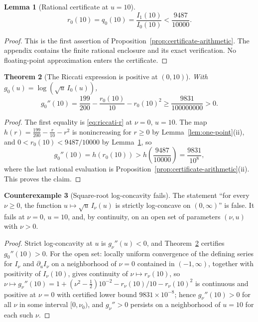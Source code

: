 \documentclass[preprint,12pt]{elsarticle}
\theoremstyle{plain}
\newtheorem{theorem}{Theorem}[section]
\newtheorem{lemma}[theorem]{Lemma}
\theoremstyle{definition}
\newtheorem{counterexample}[theorem]{Counterexample}
\theoremstyle{remark}
\begin{document}
\begin{lemma}[Rational certificate at \(u=10\)]\label{lem:certificate}
\begin{equation}
r_0(10)=q_0(10)=\frac{I_1(10)}{I_0(10)}<\frac{9487}{10000}.
\end{equation}
\end{lemma}
\begin{proof}
This is the first assertion of Proposition~\ref{prop:certificate-arithmetic}.
The appendix contains the finite rational enclosure and its exact verification.
No floating-point approximation enters the certificate.
\end{proof}

\begin{theorem}[The Riccati expression is positive at \((0,10)\)]
\label{thm:riccati-positive}
With \(g_0(u)=\log(\sqrt u\,I_0(u))\),
\begin{equation}
g_0''(10)
=\frac{199}{200}-\frac{r_0(10)}{10}-r_0(10)^2
\ge\frac{9831}{100000000}>0.
\end{equation}
\end{theorem}
\begin{proof}
The first equality is \eqref{eq:riccati-r} at \(\nu=0\), \(u=10\). The map
\(h(r)=\tfrac{199}{200}-\tfrac{r}{10}-r^2\) is nonincreasing for \(r\ge0\)
by Lemma~\ref{lem:one-point}(ii), and \(0<r_0(10)<9487/10000\) by
Lemma~\ref{lem:certificate}, so
\begin{equation}
g_0''(10)=h(r_0(10))>h\!\left(\frac{9487}{10000}\right)
=\frac{9831}{10^8},
\end{equation}
where the last rational evaluation is
Proposition~\ref{prop:certificate-arithmetic}(ii). This proves the claim.
\end{proof}

\begin{counterexample}[Square-root log-concavity fails]
\label{cx:sqrt-log-concavity}
The statement ``for every \(\nu\ge0\), the function
\(u\mapsto\sqrt u\,I_\nu(u)\) is strictly log-concave on \((0,\infty)\)''
is false. It fails at \(\nu=0\), \(u=10\), and, by continuity, on an open set
of parameters \((\nu,u)\) with \(\nu>0\).
\end{counterexample}
\begin{proof}
Strict log-concavity at \(u\) is \(g_\nu''(u)<0\), and
Theorem~\ref{thm:riccati-positive} certifies \(g_0''(10)>0\). For the open
set: locally uniform convergence of the defining series for \(I_\nu\) and
\(\partial_u I_\nu\) on a neighborhood of \(\nu=0\) contained in
\((-1,\infty)\), together with positivity of \(I_\nu(10)\), gives continuity
of \(\nu\mapsto r_\nu(10)\), so
\(\nu\mapsto g_\nu''(10)=1+(\nu^2-\tfrac12)10^{-2}-r_\nu(10)/10-r_\nu(10)^2\)
is continuous and positive at \(\nu=0\) with certified lower bound
\(9831\times10^{-8}\); hence \(g_\nu''(10)>0\) for all \(\nu\) in some
interval \([0,\nu_0)\), and \(g_\nu''>0\) persists on a neighborhood of
\(u=10\) for each such \(\nu\).
\end{proof}
\end{document}
